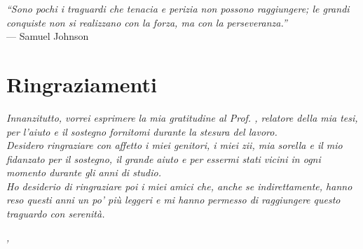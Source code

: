 \cleardoublepage
{}
{}

\begin{flushright}{
    \slshape
    ``Sono pochi i traguardi che tenacia e perizia non possono raggiungere; 
    le grandi conquiste non si realizzano con la forza, ma con la perseveranza.''} \\
    \medskip
    --- Samuel Johnson
\end{flushright}


\bigskip
\bigskip

\begingroup
\let\clearpage\relax
\let\cleardoublepage\relax
\let\cleardoublepage\relax

\chapter*{Ringraziamenti}

\noindent \textit{Innanzitutto, vorrei esprimere la mia gratitudine al Prof. \myProf, relatore della mia tesi, per l'aiuto e il sostegno fornitomi durante la stesura del lavoro.}\\

\noindent \textit{Desidero ringraziare con affetto i miei genitori, i miei zii, mia sorella e il mio fidanzato per il sostegno, il grande aiuto e per essermi stati vicini in ogni momento durante gli anni di studio.}\\

\noindent \textit{Ho desiderio di ringraziare poi i miei amici che, anche se indirettamente, hanno reso questi anni un po' più leggeri e mi hanno permesso di raggiungere questo traguardo con serenità.}\\
\bigskip

\noindent\textit{\myLocation, \myTime}
\hfill \myName

\endgroup
